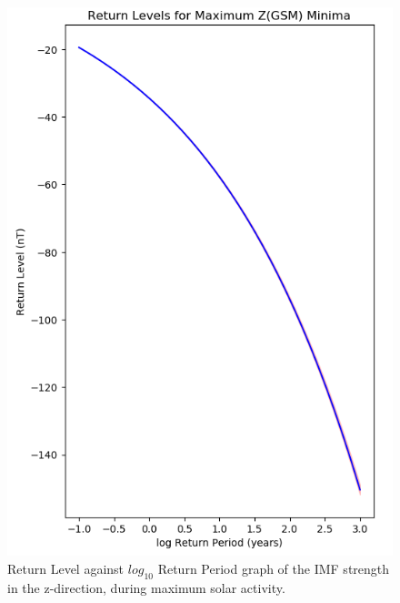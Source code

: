 \documentclass[11pt]{article}
\begin{document}
        \begin{figure}[t!]
            \begin{minipage}{0.48\textwidth}
                \centering
                \includegraphics[width=\textwidth]{fig_method/MFImaxZminReturn.png}
                \caption{Return Level against $log_{10}$ Return Period graph of the IMF strength in the z-direction, during maximum solar activity.}
                \label{fig:MFImaxZminReturn}
            \end{minipage}
            \hfill
            \begin{minipage}{0.48\textwidth}
                \centering

\end{minipage}
\end{figure}
\end{document}
